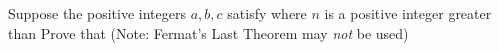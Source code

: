 Suppose the positive integers $a,b,c$ satisfy  where $n$ is a positive integer greater than  Prove that 
(Note: Fermat's Last Theorem may \textit{not} be used)